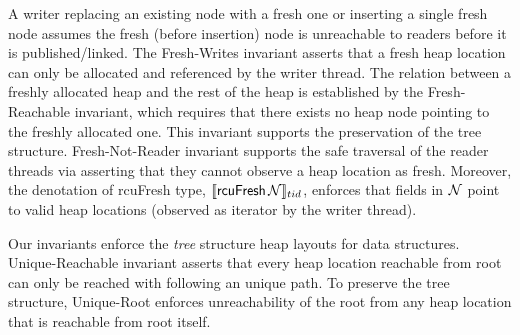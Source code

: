  A writer {replacing an existing node with a fresh one} or {inserting a single fresh node} assumes the fresh (before insertion) node is unreachable to readers before it is published/linked.
The \textsf{Fresh-Writes} invariant asserts that a fresh heap location can only be allocated and referenced by the writer thread. The relation between a freshly allocated heap and the rest of the heap is established by the \textsf{Fresh-Reachable} invariant, which requires that there exists no heap node pointing to the freshly allocated one. This invariant supports the preservation of the tree structure. \textsf{Fresh-Not-Reader} invariant supports the safe traversal of the reader threads via asserting that they cannot observe a heap location as \textsf{fresh}. 
Moreover, the denotation of \textsf{rcuFresh} type, $\llbracket \mathsf{rcuFresh}\,\mathcal{N} \rrbracket_{tid}$, enforces that fields in $\mathcal{N}$ point to valid heap locations (observed as \textsf{iterator} by the writer thread).

 Our invariants enforce the \textit{tree} structure heap layouts for data structures. \textsf{Unique-Reachable} invariant asserts that every heap location reachable from root can only be reached with following an unique path. To preserve the tree structure, \textsf{Unique-Root} enforces unreachability of the root from any heap location that is reachable from root itself. 

